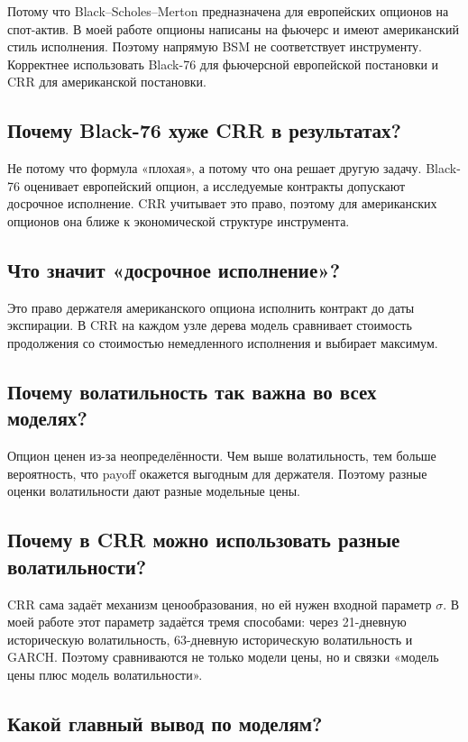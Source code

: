 \documentclass[11pt,a4paper]{article}
\begin{document}
Потому что Black--Scholes--Merton предназначена для европейских опционов на спот-актив. В моей работе опционы написаны на фьючерс и имеют американский стиль исполнения. Поэтому напрямую BSM не соответствует инструменту. Корректнее использовать Black-76 для фьючерсной европейской постановки и CRR для американской постановки.

\subsection*{Почему Black-76 хуже CRR в результатах?}

Не потому что формула «плохая», а потому что она решает другую задачу. Black-76 оценивает европейский опцион, а исследуемые контракты допускают досрочное исполнение. CRR учитывает это право, поэтому для американских опционов она ближе к экономической структуре инструмента.

\subsection*{Что значит «досрочное исполнение»?}

Это право держателя американского опциона исполнить контракт до даты экспирации. В CRR на каждом узле дерева модель сравнивает стоимость продолжения со стоимостью немедленного исполнения и выбирает максимум.

\subsection*{Почему волатильность так важна во всех моделях?}

Опцион ценен из-за неопределённости. Чем выше волатильность, тем больше вероятность, что payoff окажется выгодным для держателя. Поэтому разные оценки волатильности дают разные модельные цены.

\subsection*{Почему в CRR можно использовать разные волатильности?}

CRR сама задаёт механизм ценообразования, но ей нужен входной параметр $\sigma$. В моей работе этот параметр задаётся тремя способами: через 21-дневную историческую волатильность, 63-дневную историческую волатильность и GARCH. Поэтому сравниваются не только модели цены, но и связки «модель цены плюс модель волатильности».

\subsection*{Какой главный вывод по моделям?}
\end{document}
